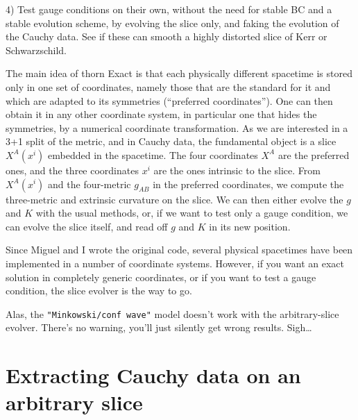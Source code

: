 4) Test gauge conditions on their own, without the need for stable BC
and a stable evolution scheme, by evolving the slice only, and faking
the evolution of the Cauchy data. See if these can smooth a highly
distorted slice of Kerr or Schwarzschild.

The main idea of thorn Exact is that each physically different
spacetime is stored only in one set of coordinates, namely those that
are the standard for it and which are adapted to its symmetries
(``preferred coordinates''). One can then obtain it in any other
coordinate system, in particular one that hides the symmetries, by a
numerical coordinate transformation. As we are interested in a 3+1
split of the metric, and in Cauchy data, the fundamental object is a
slice $X^A(x^i)$ embedded in the spacetime. The four coordinates $X^A$
are the preferred ones, and the three coordinates $x^i$ are the ones
intrinsic to the slice.  From $X^A(x^i)$ and the four-metric $g_{AB}$
in the preferred coordinates, we compute the three-metric and
extrinsic curvature on the slice. We can then either evolve the $g$
and $K$ with the usual methods, or, if we want to test only a gauge
condition, we can evolve the slice itself, and read off $g$ and $K$ in
its new position. 

Since Miguel and I wrote the original code, several physical
spacetimes have been implemented in a number of coordinate
systems. However, if you want an exact solution in completely generic
coordinates, or if you want to test a gauge condition, the slice
evolver is the way to go.

Alas, the \verb|"Minkowski/conf wave"| model doesn't work with the
arbitrary-slice evolver.  There's no warning, you'll just silently
get wrong results.  Sigh\dots


\section{Extracting Cauchy data on an arbitrary slice}


